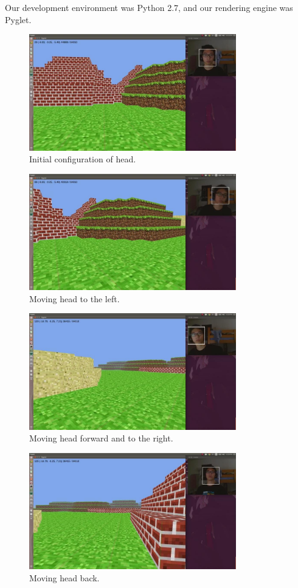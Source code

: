 \documentclass[10pt,twocolumn,letterpaper]{article}
\begin{document}
Our development environment was Python 2.7, and our rendering engine was Pyglet.
\begin{figure}[ht!]
\centering
\includegraphics[width=90mm]{left_trans.jpg}
\caption{Initial configuration of head.\label{overflow}}
\end{figure}

\begin{figure}[ht!]
\centering
\includegraphics[width=90mm]{right_trans.jpg}
\caption{Moving head to the left.\label{overflow}}
\end{figure}

\begin{figure}[ht!]
\centering
\includegraphics[width=90mm]{forward.jpg}
\caption{Moving head forward and to the right.\label{overflow}}
\end{figure}

\begin{figure}[ht!]
\centering
\includegraphics[width=90mm]{back_away.jpg}
\caption{Moving head back.\label{overflow}}
\end{figure}
\end{document}
